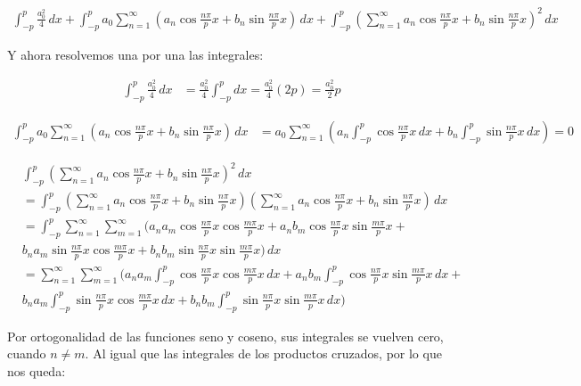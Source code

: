 \documentclass[12pt,a4paper]{article}
\begin{document}
\begin{align*}
\int_{-p}^{p} \frac{a_0^2}{4} \, dx + \int_{-p}^{p} a_0\sum_{n=1}^{\infty} \left(a_n \cos \frac{n\pi}{p}x + b_n \sin \frac{n\pi}{p}x \right) \, dx + \int_{-p}^{p} \left(\sum_{n=1}^{\infty} a_n \cos \frac{n\pi}{p}x + b_n \sin \frac{n\pi}{p}x \right)^2 \, dx
\end{align*}

Y ahora resolvemos una por una las integrales:

\begin{align*}
\int_{-p}^{p} \frac{a_0^2}{4} \, dx &= \frac{a_0^2}{4} \int_{-p}^{p} dx = \frac{a_0^2}{4} (2p) = \frac{a_0^2}{2} p
\end{align*}

\begin{align*}
\int_{-p}^{p} a_0\sum_{n=1}^{\infty} \left(a_n \cos \frac{n\pi}{p}x + b_n \sin \frac{n\pi}{p}x \right) \, dx &= a_0 \sum_{n=1}^{\infty} \left( a_n \int_{-p}^{p} \cos \frac{n\pi}{p}x \, dx + b_n \int_{-p}^{p} \sin \frac{n\pi}{p}x \, dx \right) = 0
\end{align*}

\begin{align*}
&\int_{-p}^{p} \left(\sum_{n=1}^{\infty} a_n \cos \frac{n\pi}{p}x + b_n \sin \frac{n\pi}{p}x \right)^2 \, dx 
\\& = \int_{-p}^{p} \left(\sum_{n=1}^{\infty} a_n \cos \frac{n\pi}{p}x + b_n \sin \frac{n\pi}{p}x\right)\left(\sum_{n=1}^{\infty} a_n \cos \frac{n\pi}{p}x + b_n \sin \frac{n\pi}{p}x\right)\, dx
\\& = \int_{-p}^{p} \sum_{n=1}^{\infty} \sum_{m=1}^{\infty} \Bigg(a_n a_m \cos \frac{n\pi}{p}x \cos \frac{m\pi}{p}x + a_n b_m \cos \frac{n\pi}{p}x \sin \frac{m\pi}{p}x + \\&b_n a_m \sin \frac{n\pi}{p}x \cos \frac{m\pi}{p}x + b_n b_m \sin \frac{n\pi}{p}x \sin \frac{m\pi}{p}x\Bigg) \, dx
\\& = \sum_{n=1}^{\infty} \sum_{m=1}^{\infty} \Bigg(a_n a_m \int_{-p}^{p} \cos \frac{n\pi}{p}x \cos \frac{m\pi}{p}x \, dx + a_n b_m \int_{-p}^{p} \cos \frac{n\pi}{p}x \sin \frac{m\pi}{p}x \, dx + \\&b_n a_m \int_{-p}^{p} \sin \frac{n\pi}{p}x \cos \frac{m\pi}{p}x \, dx + b_n b_m \int_{-p}^{p} \sin \frac{n\pi}{p}x \sin \frac{m\pi}{p}x\, dx\Bigg)
\end{align*}

Por ortogonalidad de las funciones seno y coseno, sus integrales se vuelven cero, cuando $n \neq m$. Al igual que las integrales de los productos cruzados, por lo que nos queda:
\end{document}
